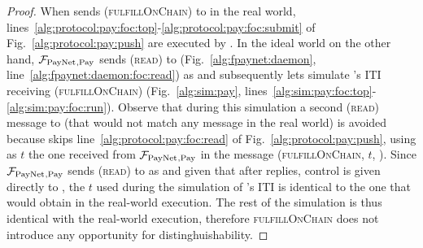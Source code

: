 \begin{proof}
  When \environment{} sends (\textsc{fulfillOnChain}) to \alice{} in the real
  world, lines~\ref{alg:protocol:pay:foc:top}-\ref{alg:protocol:pay:foc:submit}
  of Fig.~\ref{alg:protocol:pay:push} are executed by \alice. In the ideal world
  on the other hand, $\mathcal{F}_{\mathrm{PayNet}}{}_{\mathrm{, Pay}}$ sends (\textsc{read}) to
  \ledger{} (Fig.~\ref{alg:fpaynet:daemon},
  line~\ref{alg:fpaynet:daemon:foc:read}) as \alice{} and subsequently lets
  \simulator{} simulate \alice{}'s ITI receiving (\textsc{fulfillOnChain})
  (Fig.~\ref{alg:sim:pay},
  lines~\ref{alg:sim:pay:foc:top}-\ref{alg:sim:pay:foc:run}). Observe that
  during this simulation a second (\textsc{read}) message to \ledger{} (that
  would not match any message in the real world) is avoided because \simulator{}
  skips line~\ref{alg:protocol:pay:foc:read} of
  Fig.~\ref{alg:protocol:pay:push}, using as $t$ the one received from
  $\mathcal{F}_{\mathrm{PayNet}}{}_{\mathrm{, Pay}}$ in the message (\textsc{fulfillOnChain}, $t$,
  \alice). Since $\mathcal{F}_{\mathrm{PayNet}}{}_{\mathrm{, Pay}}$ sends (\textsc{read}) to
  \ledger{} as \alice{} and given that after \ledger{} replies, control is given
  directly to \simulator{}, the $t$ used during the simulation of \alice's ITI
  is identical to the one that \alice{} would obtain in the real-world
  execution. The rest of the simulation is thus identical with the real-world
  execution, therefore \textsc{fulfillOnChain} does not introduce any
  opportunity for distinghuishability.


\end{proof}
